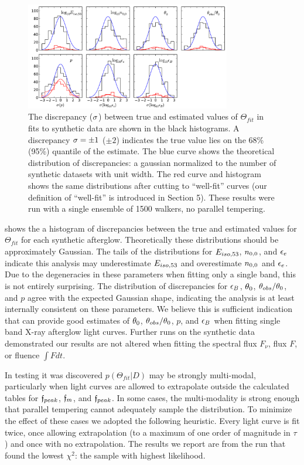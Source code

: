 \begin{figure}
\begin{center}
    \includegraphics[width=0.8\textwidth]{figures/scalefit/discrepancies.pdf}
\end{center}
	\caption{ The discrepancy ($\sigma$) between true and estimated values of $\Theta_{fit}$ in fits to synthetic data are shown in the black histograms.  A discrepancy $ \sigma=\pm 1$ ($\pm 2$) indicates the true value lies on the 68\% (95\%) quantile of the estimate.  The blue curve shows the theoretical distribution of discrepancies: a gaussian normalized to the number of synthetic datasets with unit width.  The red curve and histogram shows the same distributions after cutting to ``well-fit'' curves (our definition of ``well-fit'' is introduced in Section 5).  These results were run with a single ensemble of 1500 walkers, no parallel tempering.}
\end{figure}

 shows the a histogram of discrepancies between the true and estimated values for $\Theta_{fit}$ for each synthetic afterglow.  Theoretically these distributions should be approximately Gaussian.  The tails of the distributions for $E_{iso, 53}$, $n_{0, 0}$, and $\epsilon_e$ indicate this analysis may underestimate $E_{iso, 53}$ and overestimate $n_{0, 0}$ and $\epsilon_e$.  Due to the degeneracies in these parameters when fitting only a single band, this is not entirely surprising.  The distribution of discrepancies for $\epsilon_B$, $\theta_0$, $\theta_{obs}/\theta_0$, and $p$ agree with the expected Gaussian shape, indicating the analysis is at least internally consistent on these parameters.  We believe this is sufficient indication that \scalefit{} can provide good estimates of $\theta_0$, $\theta_{obs} / \theta_0$, $p$, and $\epsilon_B$ when fitting single band X-ray afterglow light curves.  Further runs on the synthetic data demonstrated our results are not altered when fitting the spectral flux $F_\nu$, flux $F$, or fluence $\int F dt$.

In testing it was discovered $p(\Theta_{fit}|D)$ may be strongly multi-modal, particularly when light curves are allowed to extrapolate outside the calculated tables for $\mathfrak{f}_{peak}$, $\mathfrak{f}_{m}$, and $\mathfrak{f}_{peak}$.  In some cases, the multi-modality is strong enough that parallel tempering cannot adequately sample the distribution.  To minimize the effect of these cases we adopted the following heuristic.  Every light curve is fit twice, once allowing extrapolation (to a maximum of one order of magnitude in $\tau$) and once with no extrapolation.  The results we report are from the run that found the lowest $\chi^2$: the sample with highest likelihood.    

